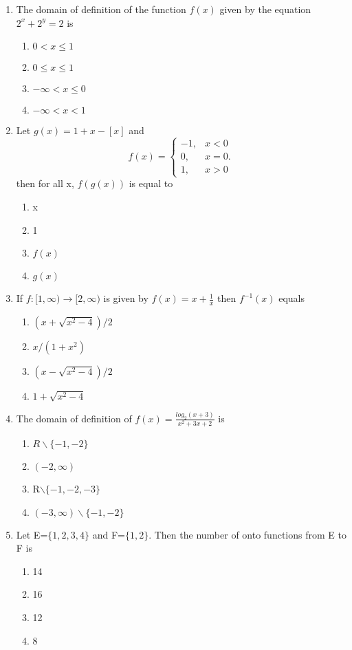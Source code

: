 \begin{enumerate}[label=\arabic*.,ref=\thesubsection.\theenumi]
\item The domain of definition of the function $f(x)$ given by the equation $2^{x} + 2^{y} = 2$ is 
\begin{enumerate}
\item $0< x \leq 1$
\item $0 \leq x \leq 1$
\item $-\infty < x \leq 0$
\item $-\infty < x < 1$
\end{enumerate}

\item Let $g(x) = 1+x-[x]$ and \[f(x)=\begin{cases} 
      -1, & x < 0\\
       0, & x = 0.\\
       1, & x > 0 
   \end{cases}\] then for all x, $f(g(x))$ is equal to
\begin{enumerate}
\item x
\item 1
\item $f(x)$
\item $g(x)$
\end{enumerate} 

\item If $f:[1,\infty) \rightarrow [2,\infty)$ is given by $f(x) = x+\frac{1}{x}$ then $f^{-1}(x)$ equals
\begin{enumerate}
\item $(x+\sqrt{x^2-4})/2$
\item $x/(1+x^2)$
\item $(x-\sqrt{x^2-4})/2$
\item $1+\sqrt{x^2-4}$
\end{enumerate}

\item The domain of definition of $f(x)=\frac{log_2(x+3)}{x^2+3x+2}$ is
\begin{enumerate}
\item $R\backslash\{-1,-2 \}$
\item $(-2,\infty)$
\item R$\backslash\{-1,-2,-3 \}$
\item $(-3,\infty)\backslash\{-1,-2 \}$
\end{enumerate} 

\item Let E=$\{1,2,3,4 \}$ and F=$\{1,2 \}$. Then the number of onto functions from E to F is
\begin{enumerate}
\item 14
\item 16
\item 12
\item 8
\end{enumerate}


\end{enumerate}
